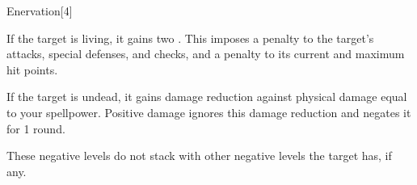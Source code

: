 \begin{spellsection}{Enervation}[4]
    \begin{spellheader}
    \end{spellheader}
    \begin{spellcontent}
        \begin{spelltargetinginfo}
        \end{spelltargetinginfo}
        \begin{spelleffects}
            \spelleffect If the target is living, it gains two . This imposes a  penalty to the target's attacks, special defenses, and checks, and a  penalty to its current and maximum hit points.

            If the target is undead, it gains damage reduction against physical damage equal to your spellpower. Positive damage ignores this damage reduction and negates it for 1 round.
        \end{spelleffects}
    \end{spellcontent}
    \begin{spellfooter}
        \spellnotes These negative levels do not stack with other negative levels the target has, if any.
        \miscastrandom
    \end{spellfooter}
\end{spellsection}

